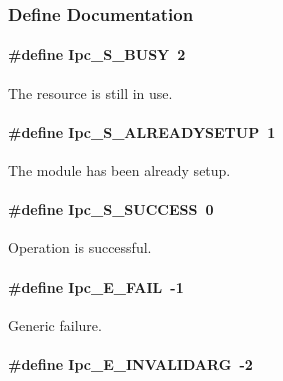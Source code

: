 \subsubsection{Define Documentation}
\paragraph[{Ipc\_\-S\_\-BUSY}]{\setlength{\rightskip}{0pt plus 5cm}\#define Ipc\_\-S\_\-BUSY~2}\hfill\label{_ipc_8h_a0d668ce8a2a1411b52db7dd0c930e0f0}


The resource is still in use. 

\paragraph[{Ipc\_\-S\_\-ALREADYSETUP}]{\setlength{\rightskip}{0pt plus 5cm}\#define Ipc\_\-S\_\-ALREADYSETUP~1}\hfill\label{_ipc_8h_a1cffa46553c4e6cb6d699f9fdadadef8}


The module has been already setup. 

\paragraph[{Ipc\_\-S\_\-SUCCESS}]{\setlength{\rightskip}{0pt plus 5cm}\#define Ipc\_\-S\_\-SUCCESS~0}\hfill\label{_ipc_8h_a3f2ce5a89194a828588322cb29548360}


Operation is successful. 

\paragraph[{Ipc\_\-E\_\-FAIL}]{\setlength{\rightskip}{0pt plus 5cm}\#define Ipc\_\-E\_\-FAIL~-\/1}\hfill\label{_ipc_8h_a156e22baea9b53fb663a7bb8684022f1}


Generic failure. 

\paragraph[{Ipc\_\-E\_\-INVALIDARG}]{\setlength{\rightskip}{0pt plus 5cm}\#define Ipc\_\-E\_\-INVALIDARG~-\/2}\hfill\label{_ipc_8h_aaf0d0edb6356669b49dcf0429e7705e0}


